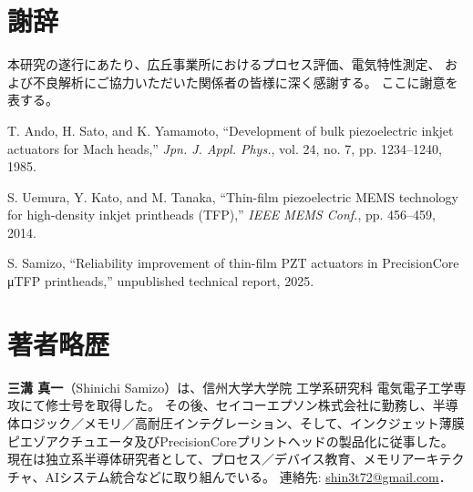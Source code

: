\documentclass[conference]{IEEEtran}
\begin{document}
\section*{謝辞}
本研究の遂行にあたり、広丘事業所におけるプロセス評価、電気特性測定、  
および不良解析にご協力いただいた関係者の皆様に深く感謝する。  
ここに謝意を表する。

\begin{thebibliography}{99}

T. Ando, H. Sato, and K. Yamamoto, 
``Development of bulk piezoelectric inkjet actuators for Mach heads,'' 
\textit{Jpn. J. Appl. Phys.}, vol. 24, no. 7, pp. 1234--1240, 1985.

S. Uemura, Y. Kato, and M. Tanaka, 
``Thin-film piezoelectric MEMS technology for high-density inkjet printheads (TFP),'' 
\textit{IEEE MEMS Conf.}, pp. 456--459, 2014.

S. Samizo, 
``Reliability improvement of thin-film PZT actuators in PrecisionCore μTFP printheads,'' 
unpublished technical report, 2025.

\end{thebibliography}

\section*{著者略歴}
\textbf{三溝 真一}（Shinichi Samizo）は、信州大学大学院 工学系研究科 電気電子工学専攻にて修士号を取得した。  
その後、セイコーエプソン株式会社に勤務し、半導体ロジック／メモリ／高耐圧インテグレーション、そして、インクジェット薄膜ピエゾアクチュエータ及びPrecisionCoreプリントヘッドの製品化に従事した。  
現在は独立系半導体研究者として、プロセス／デバイス教育、メモリアーキテクチャ、AIシステム統合などに取り組んでいる。  
連絡先: \href{mailto:shin3t72@gmail.com}{shin3t72@gmail.com}．
\end{document}
